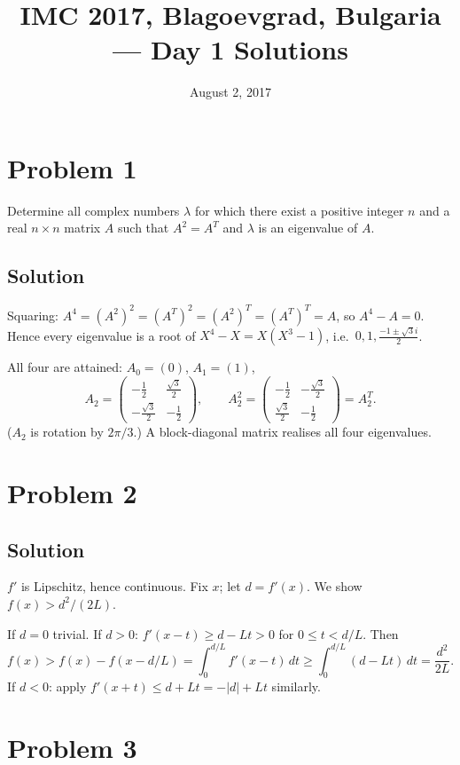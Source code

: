 \documentclass{article}
\title{IMC 2017, Blagoevgrad, Bulgaria --- Day 1 Solutions}
\date{August 2, 2017}
\begin{document}
\maketitle

\section*{Problem 1}
Determine all complex numbers $\lambda$ for which there exist a positive integer $n$ and a real $n \times n$ matrix $A$ such that $A^2 = A^T$ and $\lambda$ is an eigenvalue of $A$.

\subsection*{Solution}
Squaring: $A^4 = (A^2)^2 = (A^T)^2 = (A^2)^T = (A^T)^T = A$, so $A^4 - A = 0$. Hence every eigenvalue is a root of $X^4 - X = X(X^3 - 1)$, i.e.\ $0, 1, \frac{-1 \pm \sqrt{3}i}{2}$.

All four are attained: $A_0 = (0)$, $A_1 = (1)$,
\[ A_2 = \begin{pmatrix} -\tfrac12 & \tfrac{\sqrt3}{2} \\ -\tfrac{\sqrt3}{2} & -\tfrac12 \end{pmatrix}, \qquad A_2^2 = \begin{pmatrix} -\tfrac12 & -\tfrac{\sqrt3}{2} \\ \tfrac{\sqrt3}{2} & -\tfrac12 \end{pmatrix} = A_2^T. \]
($A_2$ is rotation by $2\pi/3$.) A block-diagonal matrix realises all four eigenvalues.

\section*{Problem 2}
\subsection*{Solution}
$f'$ is Lipschitz, hence continuous. Fix $x$; let $d = f'(x)$. We show $f(x) > d^2/(2L)$.

If $d = 0$ trivial. If $d > 0$: $f'(x-t) \ge d - Lt > 0$ for $0 \le t < d/L$. Then
\[ f(x) > f(x) - f(x - d/L) = \int_0^{d/L} f'(x-t)\,dt \ge \int_0^{d/L}(d-Lt)\,dt = \frac{d^2}{2L}. \]
If $d < 0$: apply $f'(x+t) \le d + Lt = -|d| + Lt$ similarly.

\section*{Problem 3}
\end{document}
